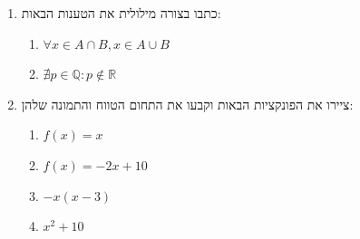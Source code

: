 \begin{enumerate}
    \item כתבו בצורה מילולית את הטענות הבאות:
		\begin{enumerate}
			\item $\forall x \in A \cap B, x \in A \cup B$
			\item $\nexists p \in \mathbb{Q} : p \notin \mathbb{R}$
		\end{enumerate}

	\item ציירו את הפונקציות הבאות וקבעו את התחום הטווח והתמונה שלהן:
		\begin{enumerate}
			\item $f(x) = x$
			\item $f(x) = -2 x + 10$
			\item $-x (x - 3)$
			\item $x^2 + 10$
		\end{enumerate}
\end{enumerate}


